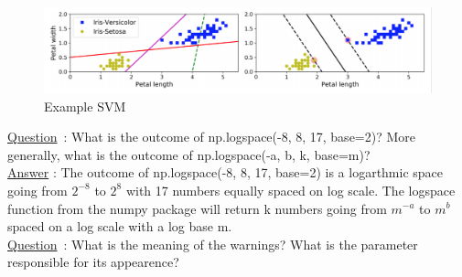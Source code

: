 \begin{figure}[ht]
	\centering 
	\includegraphics[scale = 0.35]{Pics/SVM}
	\caption{Example SVM}
\end{figure}

\underline{Question} : What is the outcome of np.logspace(-8, 8, 17, base=2)? More generally, what is the outcome of np.logspace(-a, b, k, base=m)?\\

\underline{Answer} : The outcome of np.logspace(-8, 8, 17, base=2) is a logarthmic space going from $2^{-8}$ to $2^8$ with 17 numbers equally spaced on log scale.
 The logspace function from the numpy package will return k numbers going from $m^{-a}$ to $m^b$ spaced on a log scale with a log base m. \\

\underline{Question} : What is the meaning of the warnings? What is the parameter responsible for its appearence? \\

